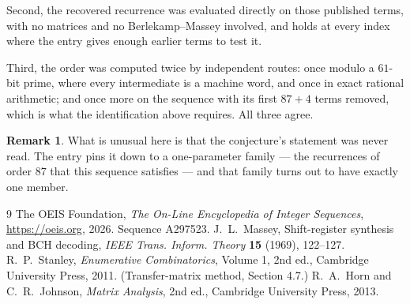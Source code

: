 \documentclass[11pt,a4paper]{article}
\theoremstyle{plain}
\theoremstyle{definition}
\newtheorem{remark}[theorem]{Remark}
\begin{document}
Second, the recovered recurrence was evaluated directly on those published terms, with no
matrices and no Berlekamp--Massey involved, and holds at every index where the entry gives
enough earlier terms to test it.

Third, the order was computed twice by independent routes: once modulo a $61$-bit prime, where
every intermediate is a machine word, and once in exact rational arithmetic; and once more on
the sequence with its first $87+4$ terms removed, which is what the identification above
requires. All three agree.

\begin{remark}
What is unusual here is that the conjecture's statement was never read. The entry pins it down
to a one-parameter family --- the recurrences of order $87$ that this sequence satisfies
--- and that family turns out to have exactly one member.
\end{remark}

\begin{thebibliography}{9}
 The OEIS Foundation, \emph{The On-Line Encyclopedia of Integer
Sequences}, \url{https://oeis.org}, 2026. Sequence A297523.
 J.~L.~Massey, Shift-register synthesis and BCH decoding, \emph{IEEE
Trans. Inform. Theory} \textbf{15} (1969), 122--127.
 R.~P.~Stanley, \emph{Enumerative Combinatorics}, Volume 1, 2nd ed.,
Cambridge University Press, 2011. (Transfer-matrix method, Section 4.7.)
 R.~A.~Horn and C.~R.~Johnson, \emph{Matrix Analysis}, 2nd ed., Cambridge
University Press, 2013.
\end{thebibliography}
\end{document}
